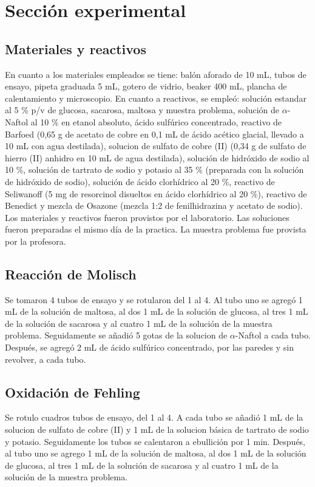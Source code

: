 \documentclass[fleqn,10pt]{SelfArx}
\begin{document}
\section{Secci\'on experimental}
	\subsection{Materiales y reactivos}
	En cuanto a los materiales empleados se tiene: balón aforado de 10 mL, tubos de ensayo, pipeta graduada 5 mL, gotero de vidrio, beaker 400 mL, plancha de calentamiento y microscopio. En cuanto a reactivos, se empleó: solución estandar al 5 \% p/v de glucosa, sacarosa, maltosa y muestra problema, solución de $\alpha$-Naftol al 10 \% en etanol absoluto, ácido sulfúrico concentrado, reactivo de Barfoed (0,65 g de acetato de cobre en 0,1 mL de ácido acético glacial, llevado a 10 mL con agua destilada), solucion de sulfato de cobre (II) (0,34 g de sulfato de hierro (II) anhidro en 10 mL de agua destilada), solución de hidróxido de sodio al 10 \%, soluci\'on de tartrato de sodio y potasio al 35 \% (preparada con la solución de hidróxido de sodio), solución de ácido clorhídrico al 20 \%, reactivo de Seliwanoff (5 mg de resorcinol disueltos en ácido clorhídrico al 20 \%), reactivo de Benedict y mezcla de Osazone (mezcla 1:2 de fenilhidrazina y acetato de sodio). Los materiales y reactivos fueron provistos por el laboratorio. Las soluciones fueron preparadas el mismo día de la practica. La muestra problema fue provista por la profesora.
	
	\subsection{Reacción de Molisch}
	Se tomaron 4 tubos de ensayo y se rotularon del 1 al 4. Al tubo uno se agreg\'o 1 mL de la solución de maltosa, al dos 1 mL de la solución de glucosa, al tres 1 mL de la solución de sacarosa y al cuatro 1 mL de la solución de la muestra problema. Seguidamente se añadió 5 gotas de la solucion de $\alpha$-Naftol a cada tubo. Después, se agreg\'o 2 mL de \'acido sulfúrico concentrado, por las paredes y sin revolver, a cada tubo.
	
	\subsection{Oxidación de Fehling}
	Se rotulo cuadros tubos de ensayo, del 1 al 4. A cada tubo se añadió 1 mL de la solucion de sulfato de cobre (II) y 1 mL de la solucion básica de tartrato de sodio y potasio. Seguidamente los tubos se calentaron a ebullición por 1 min. Después, al tubo uno se agrego 1 mL de la solución de maltosa, al dos 1 mL de la solución de glucosa, al tres 1 mL de la solución de sacarosa y al cuatro 1 mL de la solución de la muestra problema.
	
\end{document}
